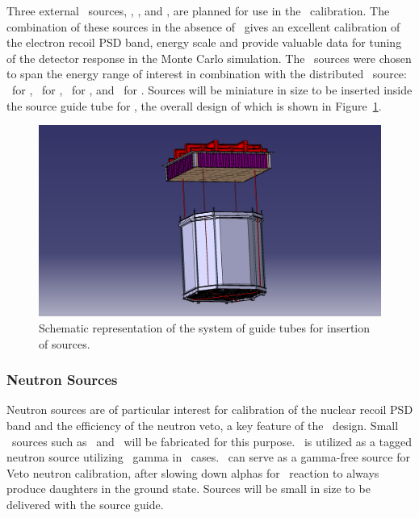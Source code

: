 Three external \gr\ sources, , \Ba, and \Cs, are planned for use in the \TPC\ calibration. The combination of these sources in the absence of \ArThirtyNine\ gives an excellent calibration of the electron recoil PSD band, energy scale and provide valuable data for tuning of the detector response in the Monte Carlo simulation. The \gr\ sources were chosen to span the energy range of interest in combination with the distributed \Kr\ source: \KrEightThreeMOneTwoECEnergy\ for \Kr, \CoEnergy\ for , \BaEnergy\ for \Ba, and \CsEnergy\ for \Cs.  Sources will be miniature in size to be inserted inside the source guide tube for \TPC, the overall design of which is shown in Figure~\ref{fig:Calibration-OverallSystemDesign}.

\begin{figure}[t!]
\includegraphics[width=\textwidth]{./Figures/TPC_calibration_system2.jpg}
\caption[Schematic of the sources insertion system]{Schematic representation of the system of guide tubes for insertion of sources.}
\label{fig:Calibration-OverallSystemDesign}
\end{figure}


\subsubsection{Neutron Sources}

Neutron sources are of particular interest for calibration of the nuclear recoil PSD band and the efficiency of the neutron veto, a key feature of the \DSks\ design.  Small \alphan\ sources such as \AmBe\ and \AmC\ will be fabricated for this purpose. \AmBe\ is utilized as a tagged neutron source utilizing \AmBeGammaEnergy\ gamma in \AmTwoFourOneGammaTwoBR\ cases. \AmC\ can serve as a gamma-free source for Veto neutron calibration, after slowing down alphas for \alphan\ reaction to always produce daughters in the ground state. Sources will be small in size to be delivered with the source guide. 

